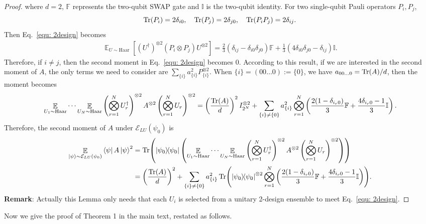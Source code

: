 \documentclass[showpacs,amsmath,amssymb,twocolumn,aps,pra,superscriptaddress,notitlepage,10pt]{revtex4-2}
\newcommand{\bE}{\mathbb E}
\newcommand{\cE}{\mathcal E_{LU}}
\newcommand{\kp}{\ket{\psi}}
\begin{document}
\begin{proof}
    where $d=2$, $\mathbb F$ represents the two-qubit SWAP gate and $\mathbb I$ is the two-qubit identity. For two single-qubit Pauli operators $P_i,P_j$,
    \begin{equation}
        \Tr(P_i)=2\delta_{i0},\quad\Tr(P_j)=2\delta_{j0}, \quad\Tr(P_iP_j)=2\delta_{ij}.
    \end{equation}
    Then Eq.~\eqref{equ: 2design} becomes
    \begin{align}
        \mathop{\bE}_{U\sim\mathrm{Haar}}[(U^\dagger)^{\otimes 2}(P_i\otimes P_j)U^{\otimes 2}]=\frac{2}{3}(\delta_{ij}-\delta_{i0}\delta_{j0})\mathbb F+\frac{1}{3}(4\delta_{i0}\delta_{j0}-\delta_{ij})\mathbb I.
    \end{align}
    Therefore, if $i\ne j$, then the second moment in Eq.~\eqref{equ: 2design} becomes $0$. According to this result, if we are interested in the second moment of $A$, the only terms we need to consider are $\sum_{\{i\}} a_{\{i\}}^2P_{\{i\}}^{\otimes 2}$. When $\{i\}=(00\dots0):=\{0\}$, we have $a_{00\dots0}=\Tr(A)/d$, then the moment becomes
    \begin{align}
        \mathop{\bE}_{U_1\sim\mathrm{Haar}}\cdots\mathop{\bE}_{U_N\sim\mathrm{Haar}}\left(\bigotimes_{r=1}^NU_r^\dagger\right)^{\otimes 2}A^{\otimes 2}\left(\bigotimes_{r=1}^NU_r\right)^{\otimes 2}=\left(\frac{\Tr(A)}{d}\right)^2I^{\otimes 2}_{2^N}+\sum_{\{i\}\ne \{0\}}a_{\{i\}}^2\bigotimes_{r=1}^{N}\left(\frac{2(1-\delta_{i_r0})}{3}\mathbb F+\frac{4\delta_{i_r0}-1}{3}\mathbb I\right).\label{equ: commoncase}
    \end{align}
    Therefore, the second moment of $A$ under $\cE(\psi_0)$ is
    \begin{align}
        \mathop{\bE}_{\kp\sim\cE(\psi_0)}\bra{\psi}A\kp^2&=\Tr(\ketbra{\psi_0}{\psi_0}\left(\mathop{\bE}_{U_1\sim\mathrm{Haar}}\cdots\mathop{\bE}_{U_N\sim\mathrm{Haar}}\left(\bigotimes_{r=1}^NU_r^\dagger\right)^{\otimes 2}A^{\otimes 2}\left(\bigotimes_{r=1}^NU_r\right)^{\otimes 2}\right))\\
        &=\left(\frac{\Tr(A)}{d}\right)^2+\sum_{\{i\}\ne\{0\}}a_{\{i\}}^2\Tr(\ketbra{\psi_0}{\psi_0}^{\otimes 2}\bigotimes_{r=1}^{N}\left(\frac{2(1-\delta_{i_r0})}{3}\mathbb F+\frac{4\delta_{i_r0}-1}{3}\mathbb I\right)).
    \end{align}
    \textbf{Remark}: Actually this Lemma only needs that each $U_i$ is selected from a unitary 2-design ensemble to meet Eq.~\eqref{equ: 2design}.
\end{proof}
Now we give the proof of Theorem 1 in the main text, restated as follows.
\end{document}
